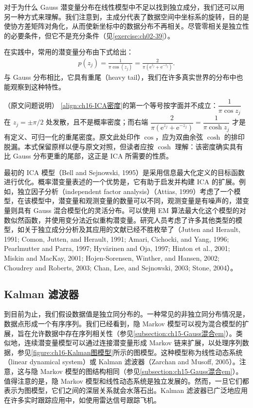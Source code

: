 \documentclass[../../main.tex]{subfiles}
\begin{document}
对于为什么 Gauss 潜变量分布在线性模型中不足以找到独立成分，我们还可以用另一种方式来理解。我们注意到，主成分代表了数据空间中坐标系的旋转，目的是使协方差矩阵对角化，从而使新坐标中的数据分布不再相关。尽管零相关是独立性的必要条件，但它不是充分条件（见\cref{exercise:ch02-39}）。

在实践中，常用的潜变量分布由下式给出：
\begin{align}
  p(z_j)=\frac{1}{\pi\cos(z_j)}=\frac{2}{\pi\left(\mathrm{e}^{z_j}+\mathrm{e}^{-z_j}\right)}.
  \label{align:ch16-ICA密度}
\end{align}
与 Gauss 分布相比，它具有重尾（heavy tail），我们在许多真实世界的分布中也能观察到这种特性。

\begin{remark}（原文问题说明）
\eqref{align:ch16-ICA密度}的第一个等号按字面并不成立：$\dfrac{1}{\pi\cos z_j}$ 在 $z_j=\pm\pi/2$ 处发散，且不是概率密度；而右端 $\dfrac{2}{\pi(\mathrm{e}^{z_j}+\mathrm{e}^{-z_j})}=\dfrac{1}{\pi\cosh z_j}$ 才是有定义、可归一化的重尾密度。原文此处印作 $\cos$，应为双曲余弦 $\cosh$ 的排印脱漏。本式保留原样以便与原文对照，但读者应按 $\cosh$ 理解：该密度确实具有比 Gauss 分布更重的尾部，这正是 ICA 所需要的性质。
\end{remark}

最初的 ICA 模型（Bell and Sejnowski, 1995）是采用信息最大化定义的目标函数进行优化。概率潜变量表述的一个优势是，它有助于启发并构建 ICA 的扩展。例如，独立因子分析（independent factor analysis）（Attias, 1999）考虑了一个模型，在该模型中，潜变量和观测变量的数量可以不同，观测变量是有噪声的，潜变量则具有 Gauss 混合模型化的灵活分布。可以使用 EM 算法最大化这个模型的对数似然函数，并使用变分法近似重构潜变量。研究人员考虑了许多其他类型的模型，如关于独立成分分析及其应用的文献已经不胜枚举了（Jutten and Herault, 1991; Comon, Jutten, and Herault, 1991; Amari, Cichocki, and Yang, 1996; Pearlmutter and Parra, 1997; Hyv\"arinen and Oja, 1997; Hinton et al., 2001; Miskin and MacKay, 2001; Hojen-Sorensen, Winther, and Hansen, 2002; Choudrey and Roberts, 2003; Chan, Lee, and Sejnowski, 2003; Stone, 2004）。

\subsection{Kalman 滤波器}\label{subsection:ch16-Kalman滤波器}

到目前为止，我们假设数据值是独立同分布的。一种常见的非独立同分布情况是，数据点形成一个有序序列。我们已经看到，隐 Markov 模型可以视为混合模型的扩展，旨在允许数据中存在序列相关性（参见\cref{subsection:ch15-Gauss混合em}）。类似地，连续潜变量模型可以通过连接潜变量形成 Markov 链来扩展，以处理序列数据，参见\cref{figure:ch16-Kalman图模型}所示的图模型。这种模型称为线性动态系统（linear dynamical system）或 Kalman 滤波器（Zarchan and Musoff, 2005）。注意，这与隐 Markov 模型的图结构相同（参见\cref{subsection:ch15-Gauss混合em}）。值得注意的是，隐 Markov 模型和线性动态系统是独立发展的。然而，一旦它们都表示为图模型，它们之间的深层关系就会水落石出。Kalman 滤波器已广泛地应用在许多实时跟踪应用中，如使用雷达信号跟踪飞机。
\end{document}
